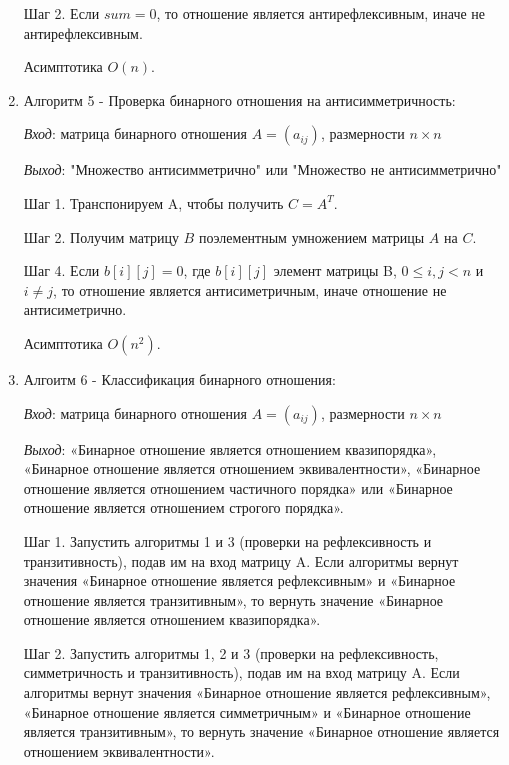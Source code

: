 \documentclass[spec, och, labwork]{shiza}
\begin{document}
\begin{enumerate}
                Шаг 2. Если $sum = 0$, то отношение является антирефлексивным, иначе не антирефлексивным.

                Асимптотика $O(n)$.

                \item Алгоритм 5 - Проверка бинарного отношения на антисимметричность:
                
                \textit{Вход}: матрица бинарного отношения $A = (a_{ij})$, размерности $n \times n$

                \textit{Выход}: "Множество антисимметрично" или "Множество не антисимметрично"

                Шаг 1. Транспонируем A, чтобы получить $C = A^T$.

                Шаг 2. Получим матрицу $B$ поэлементным умножением матрицы $A$ на $C$.

                Шаг 4. Если $b[i][j]  = 0$, где 
                $b[i][j]$ элемент матрицы B, $0 \leq i, j < n$ и $i \neq j$, то отношение является антисиметричным, иначе отношение не антисиметрично.

                Асимптотика $O(n^2)$.

                \item Алгоитм 6 - Классификация бинарного отношения:
                
                \textit{Вход}: матрица бинарного отношения $A = (a_{ij})$, размерности $n \times n$

                \textit{Выход}: «Бинарное отношение является отношением квазипорядка», «Бинарное отношение является отношением 
                эквивалентности», «Бинарное отношение является отношением частичного порядка» или «Бинарное отношение 
                является отношением строгого порядка».

                Шаг 1. Запустить алгоритмы 1 и 3 (проверки на рефлексивность и транзитивность), подав им на вход матрицу A. Если алгоритмы вернут значения «Бинарное отношение является рефлексивным» и «Бинарное отношение является транзитивным», то вернуть значение «Бинарное отношение является отношением квазипорядка».

                Шаг 2. Запустить алгоритмы 1, 2 и 3 (проверки на рефлексивность, симметричность и транзитивность), подав им на вход матрицу A. Если алгоритмы вернут значения «Бинарное отношение является рефлексивным», «Бинарное отношение является симметричным» и «Бинарное отношение является транзитивным», то вернуть значение «Бинарное отношение является отношением эквивалентности».


\end{enumerate}
\end{document}

